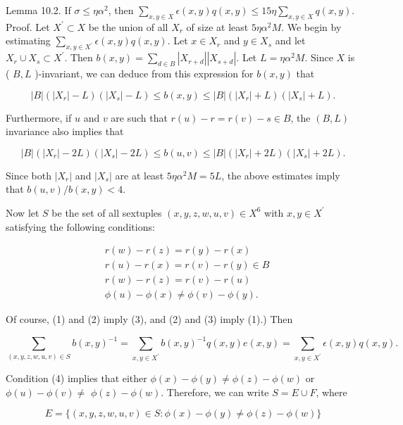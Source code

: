 \documentclass[10pt]{article}
\begin{document}
Lemma 10.2. If $\sigma \leqslant \eta \alpha^{2}$, then $\sum_{x, y \in X} \epsilon(x, y) q(x, y) \leqslant 15 \eta \sum_{x, y \in X} q(x, y)$.\\
Proof. Let $X^{\prime} \subset X$ be the union of all $X_{r}$ of size at least $5 \eta \alpha^{2} M$. We begin by estimating $\sum_{x, y \in X^{\prime}} \epsilon(x, y) q(x, y)$. Let $x \in X_{r}$ and $y \in X_{s}$ and let $X_{r} \cup X_{s} \subset X^{\prime}$. Then $b(x, y)=\sum_{d \in B}\left|X_{r+d}\right|\left|X_{s+d}\right|$. Let $L=\eta \alpha^{2} M$. Since $X$ is ( $B, L$ )-invariant, we can deduce from this expression for $b(x, y)$ that

$$
|B|\left(\left|X_{r}\right|-L\right)\left(\left|X_{s}\right|-L\right) \leqslant b(x, y) \leqslant|B|\left(\left|X_{r}\right|+L\right)\left(\left|X_{s}\right|+L\right) .
$$

Furthermore, if $u$ and $v$ are such that $r(u)-r=r(v)-s \in B$, the $(B, L)$ invariance also implies that

$$
|B|\left(\left|X_{r}\right|-2 L\right)\left(\left|X_{s}\right|-2 L\right) \leqslant b(u, v) \leqslant|B|\left(\left|X_{r}\right|+2 L\right)\left(\left|X_{s}\right|+2 L\right) .
$$

Since both $\left|X_{r}\right|$ and $\left|X_{s}\right|$ are at least $5 \eta \alpha^{2} M=5 L$, the above estimates imply that $b(u, v) / b(x, y)<4$.

Now let $S$ be the set of all sextuples $(x, y, z, w, u, v) \in X^{6}$ with $x, y \in X^{\prime}$ satisfying the following conditions:


\begin{align*}
& r(w)-r(z)=r(y)-r(x)  \tag{1}\\
& r(u)-r(x)=r(v)-r(y) \in B  \tag{2}\\
& r(w)-r(z)=r(v)-r(u)  \tag{3}\\
& \phi(u)-\phi(x) \neq \phi(v)-\phi(y) . \tag{4}
\end{align*}


Of course, (1) and (2) imply (3), and (2) and (3) imply (1).) Then

$$
\sum_{(x, y, z, w, u, v) \in S} b(x, y)^{-1}=\sum_{x, y \in X^{\prime}} b(x, y)^{-1} q(x, y) e(x, y)=\sum_{x, y \in X^{\prime}} \epsilon(x, y) q(x, y) .
$$

Condition (4) implies that either $\phi(x)-\phi(y) \neq \phi(z)-\phi(w)$ or $\phi(u)-\phi(v) \neq$ $\phi(z)-\phi(w)$. Therefore, we can write $S=E \cup F$, where

$$
E=\{(x, y, z, w, u, v) \in S: \phi(x)-\phi(y) \neq \phi(z)-\phi(w)\}
$$
\end{document}
